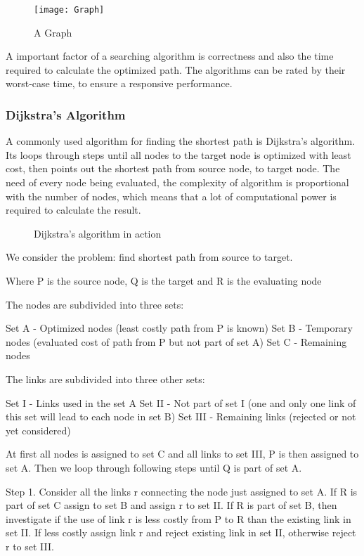   \begin{figure}[ht!]
    \centering
    \texttt{[image: Graph]}
    \caption{A Graph}
    \label{overflow}
  \end{figure}

  A important factor of a searching algorithm is correctness and also the time required to calculate the optimized path.
  The algorithms can be rated by their worst-case time, to ensure a responsive performance.

  \subsubsection{Dijkstra's Algorithm}

  A commonly used algorithm for finding the shortest path is Dijkstra's algorithm. Its loops through steps until all nodes to the target node is optimized with least cost, then points out the shortest path from source node, to target node. The need of every node being evaluated, the complexity of algorithm is proportional with the number of nodes, which means that a lot of computational power is required to calculate the result. \cite{Dijkstra}

  \begin{figure}[ht!]
    \centering
    \caption{Dijkstra's algorithm in action}
    \label{overflow}
  \end{figure}

  We consider the problem: find shortest path from source to target.

  Where P is the source node, Q is the target and R is the evaluating node

  The nodes are subdivided into three sets:

  Set A - Optimized nodes (least costly path from P is known)
  Set B - Temporary nodes (evaluated cost of path from P but not part of set A)
  Set C - Remaining nodes

  The links are subdivided into three other sets:

  Set I - Links used in the set A
  Set II - Not part of set I (one and only one link of this set will lead to each node in set B)
  Set III - Remaining links (rejected or not yet considered)

  At first all nodes is assigned to set C and all links to set III, P is then assigned to set A.
  Then we loop through following steps until Q is part of set A.

  Step 1. Consider all the links r connecting the node just assigned to set A. If R is part of set C assign to set B and assign r to set II.
  If R is part of set B, then investigate if the use of link r is less costly from P to R than the existing link in set II. If less costly assign link r and reject existing link in set II, otherwise reject r to set III.

